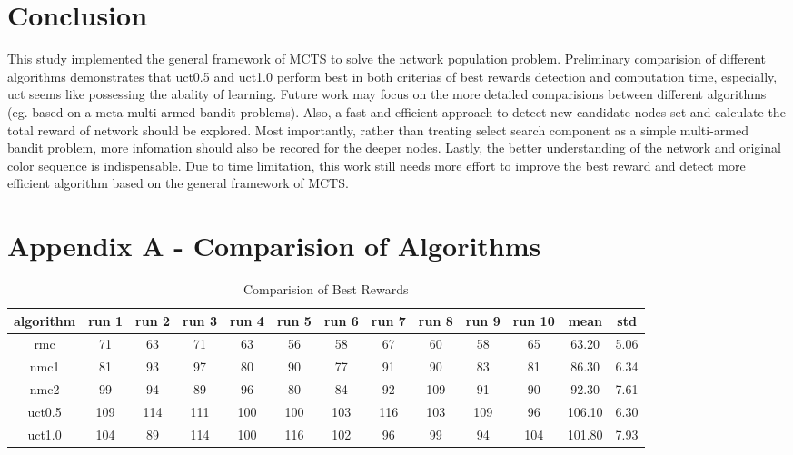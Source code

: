 \documentclass{article}
\begin{document}
\section{Conclusion}
This study implemented the general framework of MCTS to solve the network population problem. Preliminary comparision of different algorithms demonstrates that uct0.5 and uct1.0 perform best in both criterias of best rewards detection and computation time, especially, uct seems like possessing the abality of learning. Future work may focus on the more detailed comparisions between different algorithms (eg. based on a meta multi-armed bandit problems). Also, a fast and efficient approach to detect new candidate nodes set and calculate the total reward of network should be explored. Most importantly, rather than treating select search component as a simple multi-armed bandit problem, more infomation should also be recored for the deeper nodes. Lastly, the better understanding of the network and original color sequence is indispensable. Due to time limitation, this work still needs more effort to improve the best reward and detect more efficient algorithm based on the general framework of MCTS. 

\nocite{*}



\newpage

\section*{Appendix A - Comparision of Algorithms}

\begin{table}[htbp]
  \centering
  \caption{Comparision of Best Rewards}
    \begin{tabular}{ccccccccccccc}
    \toprule
    algorithm &  run 1 & run 2 & run 3 & run 4 & run 5 & run 6 & run 7 & run 8 & run 9 & run 10 & mean & std\\
    \midrule
    rmc & 71 & 63 & 71 & 63 & 56 & 58 & 67 & 60 & 58 & 65 & 63.20 & 5.06\\
    nmc1 & 81 & 93 & 97 & 80 & 90 & 77 & 91 & 90 & 83 & 81 & 86.30 & 6.34 \\
    nmc2 & 99 & 94 & 89 & 96 & 80 & 84 & 92 & 109 & 91 & 90 & 92.30 & 7.61 \\
    uct0.5 & 109 & 114 & 111 & 100 & 100 & 103 & 116 & 103 & 109 & 96 & 106.10 & 6.30 \\
    uct1.0 & 104 & 89 & 114 & 100 & 116 & 102 & 96 & 99 & 94 & 104 & 101.80 & 7.93 \\
    \bottomrule
    \end{tabular}%
  \label{tab:best_rewards_compare}%
\end{table}%
\end{document}
